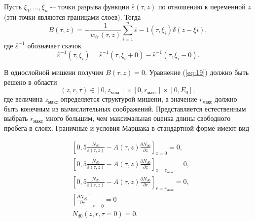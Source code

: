 Пусть \(\xi_1,\ldots,\xi_n\) -– точки разрыва функции \(\bar{\varepsilon}(\tau , z)\) по отношению к переменной \( z \) (эти точки являются границами слоев). Тогда
\begin{equation}
B(\tau, z) = −\frac{1}{w_{tr}(\tau, z)}\sum_{i=1}^{n} \bar{\varepsilon} −1 (\tau ,\xi_i ) \delta ( z − \xi i ) ,    
\end{equation}
где \(\bar{\varepsilon}^{−1}\) обозначает скачок
\begin{equation}
    \bar{\varepsilon}^{−1} (\tau ,\xi_i ) = \bar{\varepsilon}^{−1} (\tau,\xi_i + 0 ) − \bar{\varepsilon}^{−1} (\tau ,\xi_i − 0 ).
\end{equation}

В однослойной мишени получим \( B(\tau,z)=0 \).
Уравнение (\ref{eq:19}) должно быть решено в области
\begin{equation}
    (z, r,\tau) \in [0, z_\text{макс}]\times [0, r_\text{макс} ]\times[0, E_0],    
\end{equation}
где величина \( z_\text{макс} \) определяется структурой мишени, а значение \( r_\text{макс} \) должно быть
конечным из вычислительных соображений. Представляется естественным выбрать \( r_\text{макс} \)
много большим, чем максимальная оценка длины свободного пробега в слоях.
Граничные и условия Маршака в стандартной форме \cite{keiz} имеют вид

\begin{align}
& \left[0,5 \frac{N_{d0}}{\bar{\varepsilon}(\tau, z)} − A (\tau , z)\frac{\partial N_{d0}}{\partial z}\right]_{z=0} = 0 ,\\
& \left[0,5 \frac{N_{d0}}{\bar{\varepsilon}(\tau, z)} − A (\tau , z)\frac{\partial N_{d0}}{\partial z}\right]_{z=z_\text{макс}} = 0 ,\\
& \left[0,5 \frac{N_{d0}}{\bar{\varepsilon}(\tau, z)} − A (\tau , z)\frac{\partial N_{d0}}{\partial r}\right]_{r=r_\text{макс}} = 0,\\
& \left[\frac{\partial N_{d0}}{\partial r}\right]_{r=0} = 0\\
& N_{d0}(z, r, \tau=0 ) = 0.
\end{align}

